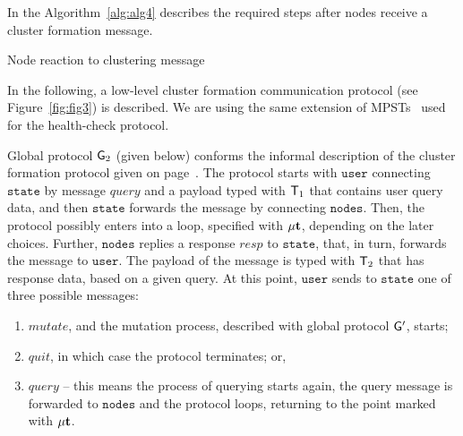 In the Algorithm~\ref{alg:alg4} describes the required steps after nodes receive a cluster formation message.

\begin{algorithm}[H]
	\SetAlgoLined
	\caption{Node reaction to clustering message}
	\label{alg:alg4}
\end{algorithm}

\noindent
In the following, a low-level cluster formation communication protocol (see Figure~\ref{fig:fig3}) is described. We are using the same extension of MPSTs~\cite{HuY17} used for the health-check protocol.

Global protocol ${\sf G}_2$ (given below) conforms the informal description of the cluster formation protocol given on page~\pageref{cluster_formation_informal_description}. 
The protocol starts with $\mathtt{user}$ connecting $\mathtt{state}$ by message $\mathit{query}$ and a payload typed with ${\mathsf T}_1$ that contains user query data, and  then $\mathtt{state}$ forwards the message by connecting $\mathtt{nodes}$. 
Then, the protocol possibly enters into a loop, specified with $\mu\textbf{t}$, depending on the later choices. 
Further, $\mathtt{nodes}$ replies a response $\mathit{resp}$ to $\mathtt{state}$, that, in turn, forwards the message to $\mathtt{user}$. The payload of the message is typed with ${\mathsf T}_2$ that has response data, based on a given query. 
At this point, $\mathtt{user}$  sends to $\mathtt{state}$ one of three possible messages:

\begin{enumerate}[start=1,label={(\bfseries \arabic*)}]
	\item $\mathit{mutate}$, and the mutation process, described with global protocol ${\sf G}'$, starts; 
	\item $\mathit{quit}$, in which case the protocol terminates; or,
	\item $\mathit{query}$ -- this means the process of querying starts again, the query message is forwarded to $\mathtt{nodes}$ and the protocol loops, returning to the point marked with $\mu\textbf{t}$.
\end{enumerate}

